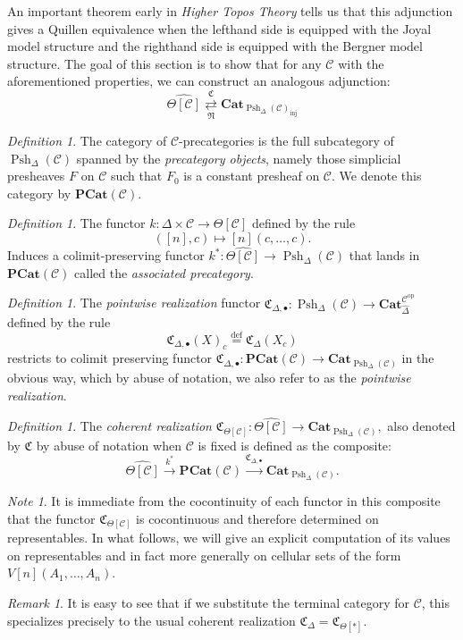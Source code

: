\documentclass[leqno]{article}
\numberwithin{equation}{subsection}
\theoremstyle{plain}   %
\theoremstyle{remark}
\newtheorem{rem}[equation]{Remark}
\newtheorem{note}[equation]{Note}
\newtheorem{defn}[equation]{Definition}
\theoremstyle{plain}
\newcommand{\op}{\ensuremath{\mathrm{op}}}
\newcommand{\Cat}{\ensuremath{\mathbf{Cat}}}
\newcommand{\psh}[1]{\ensuremath{\widehat{#1}}}
\providecommand{\C}{}
\renewcommand{\C}{\ensuremath{\mathcal{C}}}
\newcommand{\defeq}{\overset{\mathrm{def}}=}
\newcommand{\cellset}{\ensuremath{\widehat{\Theta[\mathcal{C}]}}}
\newcommand{\spsh}{\ensuremath{\operatorname{Psh}_\Delta(\mathcal{C})}}
\begin{document}
An important theorem early in \emph{Higher Topos Theory} tells us that this adjunction gives a Quillen equivalence when the lefthand side is equipped with the Joyal model structure and the righthand side is equipped with the Bergner model structure.  The goal of this section is to show that for any \(\C\) with the aforementioned properties, we can construct an analogous adjunction:
\[\cellset \underset{\mathfrak{N}}{\overset{\mathfrak{C}}{\rightleftarrows}} \Cat_{{\spsh}_{\operatorname{inj}}}\]


\begin{defn} 
	The category of \(\C\)-precategories is the full subcategory of \(\spsh\) spanned by the \emph{precategory objects}, namely those simplicial presheaves \(F\) on \(\C\) such that \(F_0\) is a constant presheaf on \(\C\).  We denote this category by \(\mathbf{PCat}(\C)\). 
\end{defn}

\begin{defn}
	The functor \(k: \Delta \times \C\to \Theta[\C]\) defined by the rule 
	\[
		([n],c) \mapsto [n](c,\dots,c).
	\]
	Induces a colimit-preserving functor \(k^\ast: \cellset \to \spsh\) that lands in \(\mathbf{PCat}(\C)\) called the \emph{associated precategory}.
\end{defn}

\begin{defn}\label{pointwisedefn}
	The \emph{pointwise realization} functor \(\mathfrak{C}_{\Delta,\bullet}: \spsh \to \Cat_{\psh{\Delta}}^{\C^\op}\) defined by the rule 
	\[
		\mathfrak{C}_{\Delta,\bullet}(X)_c \defeq \mathfrak{C}_{\Delta}(X_c)
	\]
		restricts to colimit preserving functor \(\mathfrak{C}_{\Delta,\bullet}: \mathbf{PCat}(\C) \to \Cat_{\spsh}\) in the obvious way, which by abuse of notation, we also refer to as the \emph{pointwise realization}.
\end{defn}

\begin{defn}
	The \emph{coherent realization} \(\mathfrak{C}_{\Theta[\C]}:\cellset \to \Cat_{\spsh},\) also denoted by \(\mathfrak{C}\) by abuse of notation when \(\C\) is fixed is defined as the composite: 
	\[
		\cellset \xrightarrow{k^\ast} \mathbf{PCat}(\C) \xrightarrow{\mathfrak{C}_{\Delta,\bullet}} \Cat_{\spsh}.
	\] 
\end{defn}
\begin{note}
	It is immediate from the cocontinuity of each functor in this composite that the functor \(\mathfrak{C}_{\Theta[\C]}\) is cocontinuous and therefore determined on representables. In what follows, we will give an explicit computation of its values on representables and in fact more generally on cellular sets of the form \(V[n](A_1,\dots,A_n)\).
\end{note}
\begin{rem}
	It is easy to see that if we substitute the terminal category for \(\C\), this specializes precisely to the usual coherent realization \(\mathfrak{C}_{\Delta} = \mathfrak{C}_{\Theta[\ast]}\).  
\end{rem}
\end{document}
